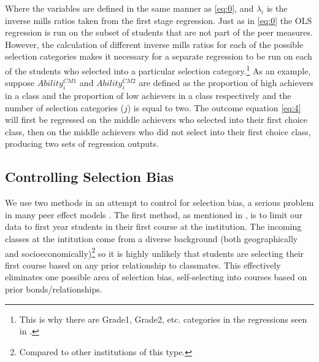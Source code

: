 Where the variables are defined in the same manner as \eqref{eq:0}, and $\lambda_{i}$ is the inverse mills ratios taken from the first stage regression.
Just as in \eqref{eq:0} the OLS regression is run on the subset of students that are not part of the peer measures. 
However, the calculation of different inverse mills ratios for each of the possible selection categories makes it necessary for a separate regression to be run on each of the students who selected into a particular selection category.\footnote{This is why there are Grade1, Grade2, etc. categories in the regressions seen in .}
As an example, suppose $Ability_{i}^{CM1}$ and $Ability_{i}^{CM2}$ are defined as the proportion of high achievers in a class and the proportion of low achievers in a class respectively and the number of selection categories ($j$) is equal to two. 
The outcome equation \eqref{eq:4} will first be regressed on the middle achievers who selected into their first choice class, then on the middle achievers who did not select into their first choice class, producing two sets of regression outputs. 

\subsection{Controlling Selection Bias}\label{methods:csb}

We use two methods in an attempt to control for selection bias, a serious problem in many peer effect models \citep{carman2012classroom,burke2013classroom,ding2007peers}. 
The first method, as mentioned in , is to limit our data to first year students in their first course at the institution.
The incoming classes at the intitution come from a diverse background (both geographically and socioeconomically)\footnote{Compared to other institutions of this type.} so it is highly unlikely that students are selecting their first course based on any prior relationship to classmates.
This effectively eliminates one possible area of selection bias, self-selecting into courses based on prior bonds/relationships.

